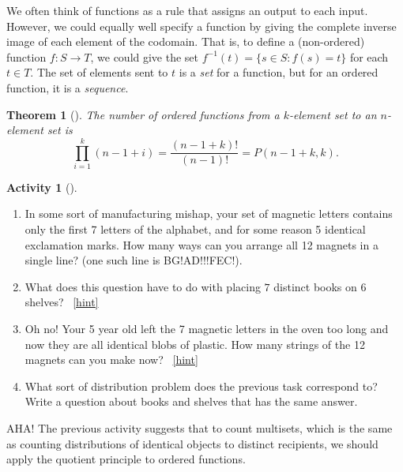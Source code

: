 \documentclass[10pt,]{book}
\theoremstyle{plain}
\newtheorem{theorem}{Theorem}[section]
\theoremstyle{definition}
\theoremstyle{definition}
\theoremstyle{definition}
\newtheorem{activity}[project]{Activity}
\numberwithin{equation}{chapter}
\def\inv{^{-1}}
\def\st{:}
\begin{document}
\par
\hypertarget{p-844}{}%
We often think of functions as a rule that assigns an output to each input.  However, we could equally well specify a function by giving the complete inverse image of each element of the codomain.  That is, to define a (non-ordered) function \(f:S \to T\), we could give the set \(f\inv(t) = \{s \in S \st f(s) = t\}\) for each \(t \in T\).  The set of elements sent to \(t\) is a \emph{set} for a function, but for an ordered function, it is a \emph{sequence}.%
\begin{theorem}[{}]\label{theorem-12}
\hypertarget{p-845}{}%
The number of ordered functions from a \(k\)-element set to an \(n\)-element set is%
\begin{equation*}
\prod_{i=1}^k (n-1+i) = \frac{(n-1+k)!}{(n-1)!} = P(n-1+k, k).
\end{equation*}
%
\end{theorem}
\begin{activity}[]\label{activity-118}
\leavevmode%
\begin{enumerate}[font=\bfseries,label=(\alph*),ref=\alph*]
\item\label{task-169} \hypertarget{p-846}{}%
In some sort of manufacturing mishap, your set of magnetic letters contains only the first 7 letters of the alphabet, and for some reason 5 identical exclamation marks.  How many ways can you arrange all 12 magnets in a single line?  (one such line is BG!AD!!!FEC!).%
\item\label{task-170} \hypertarget{p-847}{}%
What does this question have to do with placing \(7\) distinct books on \(6\) shelves?%
~\hfill{\tiny\hyperlink{a-125.b}{[hint]}\hypertarget{q-125.b}{}}\item\label{task-171} \hypertarget{p-849}{}%
Oh no! Your 5 year old left the 7 magnetic letters in the oven too long and now they are all identical blobs of plastic.  How many strings of the 12 magnets can you make now?%
~\hfill{\tiny\hyperlink{a-125.c}{[hint]}\hypertarget{q-125.c}{}}\item\label{task-172} \hypertarget{p-851}{}%
What sort of distribution problem does the previous task correspond to?  Write a question about books and shelves that has the same answer.%
\end{enumerate}
\end{activity}
\hypertarget{p-852}{}%
AHA!  The previous activity suggests that to count multisets, which is the same as counting distributions of identical objects to distinct recipients, we should apply the quotient principle to ordered functions.%
\end{document}
